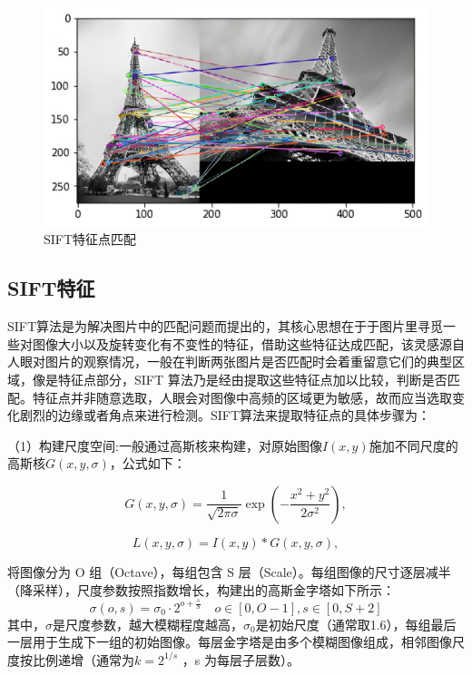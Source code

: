 \begin{figure}[H]
	\centering
	\includegraphics[width=1.0\textwidth]{images/SIFT铁塔.pdf}  %
	\caption{SIFT特征点匹配}
	\label{fig:Tower}  %
\end{figure}

\subsection{SIFT特征}

SIFT算法是为解决图片中的匹配问题而提出的，其核心思想在于于图片里寻觅一些对图像大小以及旋转变化有不变性的特征，借助这些特征达成匹配，该灵感源自人眼对图片的观察情况，一般在判断两张图片是否匹配时会着重留意它们的典型区域，像是特征点部分，SIFT 算法乃是经由提取这些特征点加以比较，判断是否匹配。特征点并非随意选取，人眼会对图像中高频的区域更为敏感，故而应当选取变化剧烈的边缘或者角点来进行检测。SIFT算法来提取特征点的具体步骤为：

（1）构建尺度空间:一般通过高斯核来构建，对原始图像\(I(x, y)\)施加不同尺度的高斯核\(G(x, y, \sigma)\)，公式如下：

\begin{equation}
	G(x, y, \sigma) = \frac{1}{\sqrt{2 \pi \sigma}} \exp \left( - \frac{x^2 + y^2}{2 \sigma^2} \right),
\end{equation}

\begin{equation}
	L(x, y, \sigma) = I(x, y) * G(x, y, \sigma),
\end{equation}

将图像分为 O 组（Octave），每组包含 S 层（Scale）。每组图像的尺寸逐层减半（降采样），尺度参数按照指数增长，构建出的高斯金字塔如下所示：
\begin{equation}
	\sigma(o, s) = \sigma_0 \cdot 2^{o + \frac{s}{S}} \quad o \in [0, O - 1], s \in [0, S + 2]
\end{equation}
其中，\(\sigma\)是尺度参数，越大模糊程度越高，\(\sigma_0\)是初始尺度（通常取1.6），每组最后一层用于生成下一组的初始图像。每层金字塔是由多个模糊图像组成，相邻图像尺度按比例递增（通常为\(k = 2^{1/s}\) ，s 为每层子层数）。

